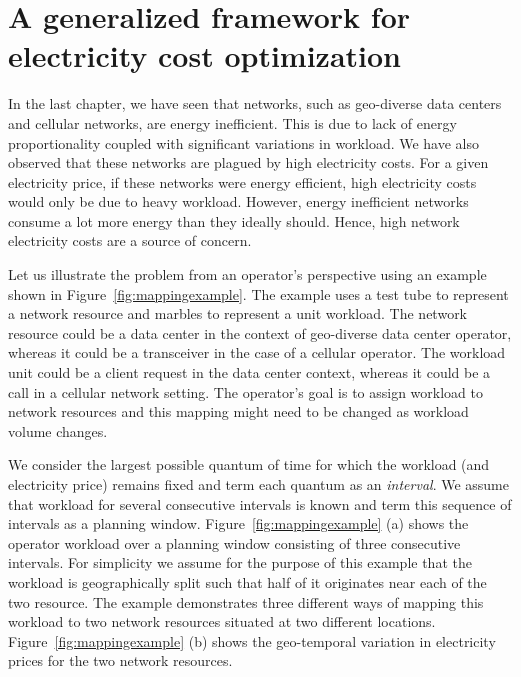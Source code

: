 \chapter{A generalized framework for electricity cost optimization}
\label{chap:framework} In the last chapter, we have seen that networks, such as geo-diverse data centers and cellular networks, are energy inefficient. This is due to lack of energy proportionality coupled with significant variations in workload. We have also observed that these networks are plagued by high electricity costs. For a given electricity price, if these networks were energy efficient, high electricity costs would only be due to heavy workload. However, energy inefficient networks consume a lot more energy than they ideally should. Hence, high network electricity costs are a source of concern. 

Let us illustrate the problem from an operator's perspective using an example shown in Figure~\ref{fig:mappingexample}. The example uses a test tube to represent a network resource and marbles to represent a unit workload. The network resource could be a data center in the context of geo-diverse data center operator, whereas it could be a transceiver in the case of a cellular operator. The workload unit could be a client request in the data center context, whereas it could be a call in a cellular network setting. The operator's goal is to assign workload to network resources and this mapping might need to be changed as workload volume changes.

We consider the largest possible quantum of time for which the workload (and electricity price) remains fixed and term each quantum as an \textit{interval}. We assume that workload for several consecutive intervals is known and term this sequence of intervals as a planning window. Figure~\ref{fig:mappingexample} (a) shows the operator workload over a planning window consisting of three consecutive intervals. For simplicity we assume for the purpose of this example that the workload is geographically split such that half of it originates near each of the two resource. The example demonstrates three different ways of mapping this workload to two network resources situated at two different locations. Figure~\ref{fig:mappingexample} (b) shows the geo-temporal variation in electricity prices for the two network resources.


